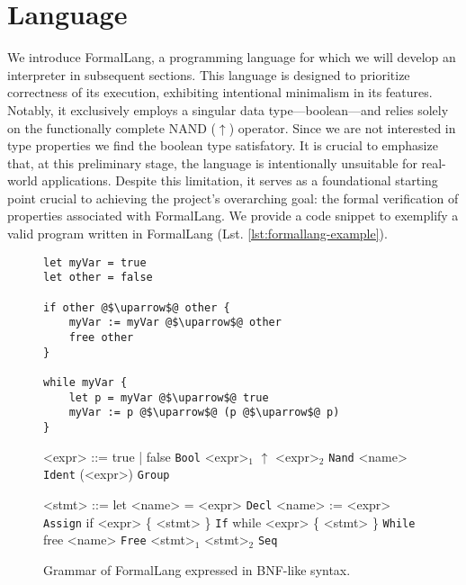 \section{Language}

We introduce FormalLang, a programming language for which we will develop an interpreter in subsequent sections. This language is designed to prioritize correctness of its execution, exhibiting intentional minimalism in its features. Notably, it exclusively employs a singular data type—boolean—and relies solely on the functionally complete NAND ($\uparrow$) operator. Since we are not interested in type properties we find the boolean type satisfatory. It is crucial to emphasize that, at this preliminary stage, the language is intentionally unsuitable for real-world applications. Despite this limitation, it serves as a foundational starting point crucial to achieving the project's overarching goal: the formal verification of properties associated with FormalLang. We provide a code snippet to exemplify a valid program written in FormalLang (Lst. \ref{lst:formallang-example}).

\begin{figure}[!h]
    \begin{minipage}{0.6\textwidth}
        \centering
        \begin{lstlisting}[caption={Program snippet written in FormalLang.},label={lst:formallang-example},frame=none]
let myVar = true
let other = false

if other @$\uparrow$@ other {
    myVar := myVar @$\uparrow$@ other
    free other
}

while myVar {
    let p = myVar @$\uparrow$@ true
    myVar := p @$\uparrow$@ (p @$\uparrow$@ p)
}
\end{lstlisting}
    \end{minipage}
    \begin{minipage}{0.4\textwidth}
        \centering
        \begin{grammar}
            <expr> ::= true | false \hfill \texttt{Bool}
            \alt <expr>$_1$ $\uparrow$ <expr>$_2$ \hfill \texttt{Nand}
            \alt <name> \hfill \texttt{Ident}
            \alt (<expr>) \hfill \texttt{Group}

            <stmt> ::= let <name> = <expr> \hfill \texttt{Decl}
            \alt <name> := <expr> \hfill \texttt{Assign}
            \alt if <expr> \{ <stmt> \} \hfill \texttt{If}
            \alt while <expr> \{ <stmt> \} \hfill \texttt{While}
            \alt free <name> \hfill \texttt{Free}
            \alt <stmt>$_1$ <stmt>$_2$ \hfill \texttt{Seq}
        \end{grammar}
        \caption{Grammar of FormalLang expressed in BNF-like syntax.}
        \label{fig:formallang-grammar}
    \end{minipage}
\end{figure}

